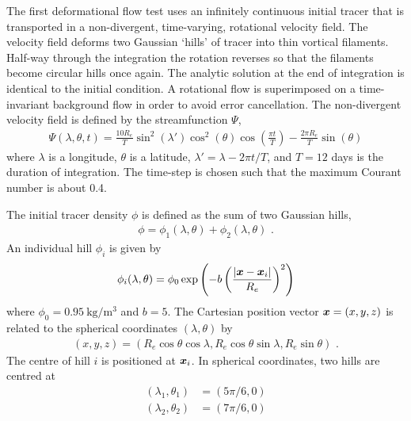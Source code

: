 The first deformational flow test uses an infinitely continuous initial tracer that is transported in a non-divergent, time-varying, rotational velocity field.
The velocity field deforms two Gaussian `hills' of tracer into thin vortical filaments.  Half-way through the integration the rotation reverses so that the filaments become circular hills once again.  The analytic solution at the end of integration is identical to the initial condition.
A rotational flow is superimposed on a time-invariant background flow in order to avoid error cancellation.
The non-divergent velocity field is defined by the streamfunction $\Psi$,
\begin{align}
	\Psi(\lambda, \theta, t) = \frac{10 R_e}{T} \sin^2 \left(\lambda'\right) \cos^2 \left(\theta\right) \cos \left( \frac{\pi t}{T} \right) - \frac{2 \pi R_e}{T} \sin\left(\theta\right)
\end{align}
where $\lambda$ is a longitude, $\theta$ is a latitude, $\lambda' = \lambda - 2 \pi t / T$, and $T = \num{12}$ days is the duration of integration.  The time-step is chosen such that the maximum Courant number is about 0.4.

The initial tracer density $\phi$ is defined as the sum of two Gaussian hills,
\begin{align}
	\phi = \phi_1(\lambda, \theta) + \phi_2(\lambda, \theta) \text{ .}
\end{align}
An individual hill $\phi_i$ is given by
\begin{align}
	\phi_i(\lambda, \theta) = \phi_0 \exp\left( -b \left( \frac{\left\lvert \bm{x} - \bm{x}_i \right\rvert}{R_e} \right)^2 \right)
\end{align}
where $\phi_0 = \SI{0.95}{\kilo\gram\per\meter\cubed}$ and $b = 5$.  The Cartesian position vector $\bm{x} = (x,y,z)$ is related to the spherical coordinates $(\lambda, \theta)$ by
\begin{align}
	(x,y,z) = (R_e \cos \theta \cos \lambda, R_e \cos \theta \sin \lambda, R_e \sin \theta) \label{eqn:cubicFit:spherical-cartesian} \text{ .}
\end{align}
The centre of hill $i$ is positioned at $\bm{x}_i$.  In spherical coordinates, two hills are centred at
\begin{align}
	(\lambda_1,\theta_1) &= (5 \pi /6, 0) \\
	(\lambda_2,\theta_2) &= (7 \pi /6, 0)
\end{align}

